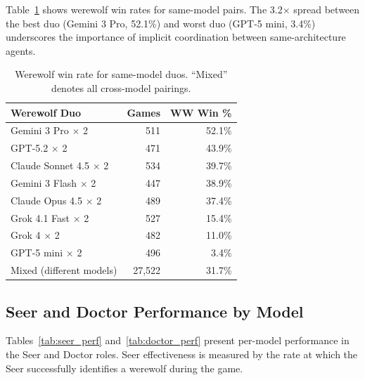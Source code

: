 Table~\ref{tab:duo_matrix} shows werewolf win rates for same-model pairs. The 3.2$\times$ spread between the best duo (Gemini 3 Pro, 52.1\%) and worst duo (GPT-5 mini, 3.4\%) underscores the importance of implicit coordination between same-architecture agents.

\begin{table}[ht]
\caption{Werewolf win rate for same-model duos. ``Mixed'' denotes all cross-model pairings.}
\label{tab:duo_matrix}
\centering
\small
\begin{tabular}{lrr}
\toprule
\textbf{Werewolf Duo} & \textbf{Games} & \textbf{WW Win \%} \\
\midrule
Gemini 3 Pro $\times$ 2    & 511 & 52.1\% \\
GPT-5.2 $\times$ 2         & 471 & 43.9\% \\
Claude Sonnet 4.5 $\times$ 2 & 534 & 39.7\% \\
Gemini 3 Flash $\times$ 2  & 447 & 38.9\% \\
Claude Opus 4.5 $\times$ 2 & 489 & 37.4\% \\
Grok 4.1 Fast $\times$ 2   & 527 & 15.4\% \\
Grok 4 $\times$ 2          & 482 & 11.0\% \\
GPT-5 mini $\times$ 2      & 496 &  3.4\% \\
\midrule
Mixed (different models)    & 27,522 & 31.7\% \\
\bottomrule
\end{tabular}
\end{table}


\subsection{Seer and Doctor Performance by Model}
\label{app:role_performance}

Tables~\ref{tab:seer_perf} and~\ref{tab:doctor_perf} present per-model performance in the Seer and Doctor roles. Seer effectiveness is measured by the rate at which the Seer successfully identifies a werewolf during the game.

